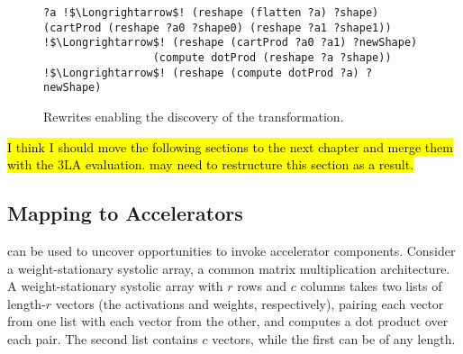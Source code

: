 \begin{figure}
\begin{lstlisting}[escapechar=!]
                                                    ?a !$\Longrightarrow$! (reshape (flatten ?a) ?shape) 
(cartProd (reshape ?a0 ?shape0) (reshape ?a1 ?shape1)) !$\Longrightarrow$! (reshape (cartProd ?a0 ?a1) ?newShape)
                 (compute dotProd (reshape ?a ?shape)) !$\Longrightarrow$! (reshape (compute dotProd ?a) ?newShape)
\end{lstlisting}
\caption{Rewrites enabling the discovery of the \itc transformation.}
\label{fig:im2col-rewrites}
\end{figure}


\hl{I think I should move the following sections to the next chapter and merge them with the 3LA evaluation. may need to restructure this section as a result.}

\subsection{Mapping  to Accelerators}
\label{sec:case-study-tensorization}


\g can be used to uncover opportunities
  to invoke accelerator components.
Consider a 
  weight-stationary systolic array,
  a common matrix multiplication
  architecture.
A weight-stationary
  systolic array
  with $r$ rows
  and $c$ columns
  takes two lists
  of length-$r$ vectors
  (the activations
    and weights, respectively),
  pairing each vector
  from one list
  with each vector
  from the other,
  and computes a dot product
  over each pair.
The second list
  contains $c$ vectors,
  while the first
  can be of any length.
  
